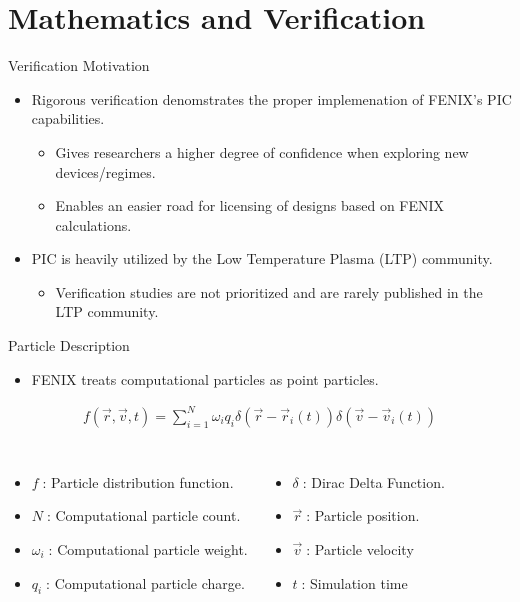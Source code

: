 \documentclass[aspectratio=169, 16pt]{beamer}
\begin{document}
\section{Mathematics and Verification}

\begin{frame}{Verification Motivation}
  \vfill{}
  \begin{itemize}
    \item Rigorous verification denomstrates the proper implemenation of FENIX's PIC capabilities.
    \begin{itemize}
      \item Gives researchers a higher degree of confidence when exploring new devices/regimes.
      \item Enables an easier road for licensing of designs based on FENIX calculations.
    \end{itemize}
    \item PIC is heavily utilized by the Low Temperature Plasma (LTP) community.
    \begin{itemize}
      \item Verification studies are not prioritized and are rarely published in the LTP community\cite{alves2023foundations}.
    \end{itemize}
  \end{itemize}
\end{frame}

\begin{frame}{Particle Description}
    \vfill{}
    \begin{itemize}
      \item FENIX treats computational particles as point particles.
    \end{itemize}
    \begin{align*}
      f \left( \vec{r}, \vec{v}, t \right) 
      =
      \sum_{i=1}^N 
      \omega_i q_i 
      \delta \left( \vec{r} - \vec{r}_i(t) \right)
      \delta \left( \vec{v} - \vec{v}_i(t) \right)
    \end{align*}
    \begin{columns}
      \begin{itemize}
        \item $f\;$: Particle distribution function.
        \item $N\;$: Computational particle count. 
        \item $\omega_i\;$: Computational particle weight.
        \item $q_i\;$: Computational particle charge.
      \end{itemize} 
      \begin{itemize}
        \item $\delta\;$: Dirac Delta Function.
        \item $\vec{r}\;$: Particle position.
        \item $\vec{v}\;$: Particle velocity
        \item $t\;$: Simulation time
      \end{itemize}
    \end{columns}
\end{frame}
\end{document}
